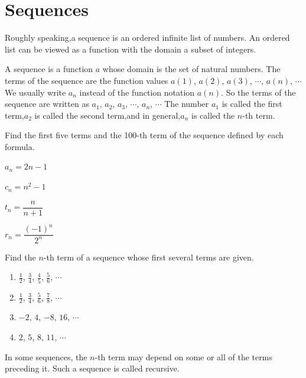 
\section{Sequences}
Roughly speaking,a sequence is an ordered infinite list of numbers.
An ordered list can be viewed as a function with the domain a subset of integers.

\begin{definition}
A sequence is a function $a$ whose domain is the set of natural numbers. The terms of the sequence are the function values $a(1)$, $a(2)$, $a(3)$, $\cdots$, $a(n)$, $\cdots$
We usually write $a_n$ instead of the function notation $a(n)$. So the terms of the sequence are written as
$a_1$, $a_2$, $a_3$, $\cdots$, $a_n$, $\cdots$
The number $a_1$ is called the first term,$a_2$ is called the second term,and in general,$a_n$ is called the $n$-th term.
\end{definition}
\begin{example}
    Find the first five terms and the 100-th term of the sequence defined by each formula.
    \begin{enumerate*}
        \item $a_n=2n-1$
        \item $c_n=n^2-1$
        \item $t_n=\dfrac{n}{n+1}$
        \item $r_n=\dfrac{(-1)^n}{2^n}$
    \end{enumerate*}
\end{example}
\vspace*{6\baselineskip}

\begin{example}
    Find the $n$-th term of a sequence whose first several terms are given.
    \begin{enumerate}
        \item $\frac{1}{2}$, $\frac{3}{4}$, $\frac{4}{5}$, $\frac{5}{6}$, $\cdots$
        \item $\frac{1}{2}$, $\frac{3}{4}$, $\frac{5}{6}$, $\frac{7}{8}$, $\cdots$
        \item $-2$, $4$, $-8$, $16$, $\cdots$
        \item $2$, $5$, $8$, $11$, $\cdots$
    \end{enumerate}
\end{example}

In some sequences, the $n$-th term may depend on some or all of the terms preceding
it. Such a sequence is called recursive.

